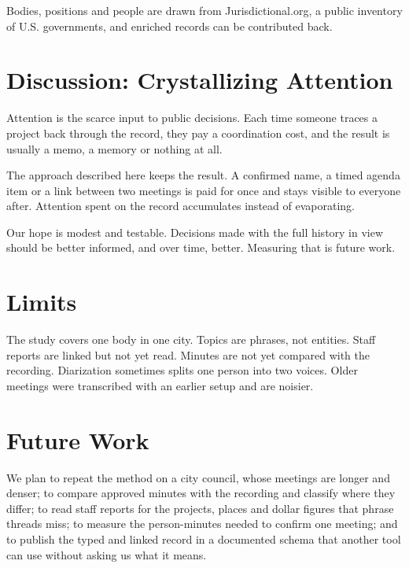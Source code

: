 \documentclass[
  american,
  letterpaper,
  11pt]{article}
\begin{document}
Bodies, positions and people are drawn from Jurisdictional.org, a public inventory of U.S. governments, and enriched records can be contributed back.

\section{Discussion: Crystallizing Attention}\label{discussion-crystallizing-attention}

Attention is the scarce input to public decisions.
Each time someone traces a project back through the record, they pay a coordination cost, and the result is usually a memo, a memory or nothing at all.

The approach described here keeps the result.
A confirmed name, a timed agenda item or a link between two meetings is paid for once and stays visible to everyone after.
Attention spent on the record accumulates instead of evaporating.

Our hope is modest and testable.
Decisions made with the full history in view should be better informed, and over time, better.
Measuring that is future work.

\section{Limits}\label{limits}

The study covers one body in one city.
Topics are phrases, not entities.
Staff reports are linked but not yet read.
Minutes are not yet compared with the recording.
Diarization sometimes splits one person into two voices.
Older meetings were transcribed with an earlier setup and are noisier.

\section{Future Work}\label{future-work}

We plan to repeat the method on a city council, whose meetings are longer and denser; to compare approved minutes with the recording and classify where they differ; to read staff reports for the projects, places and dollar figures that phrase threads miss; to measure the person-minutes needed to confirm one meeting; and to publish the typed and linked record in a documented schema that another tool can use without asking us what it means.
\end{document}

